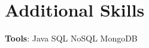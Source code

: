 

\section{Additional Skills}
\begin{itemize}[leftmargin=0.15in, label={}]
\small{\item{\textbf{Tools}:
    Java\hspace{0.1em}\resumeDot\hspace{0.1em}
    SQL\hspace{0.1em}\resumeDot\hspace{0.1em}
    NoSQL\hspace{0.1em}\resumeDot\hspace{0.1em}
    MongoDB\hspace{0.1em}\resumeDot\hspace{0.1em}
}}
\end{itemize}
